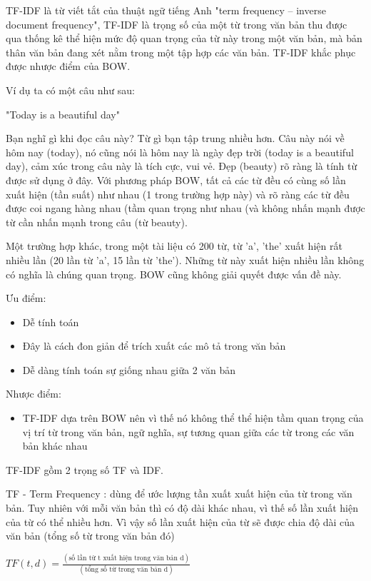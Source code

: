 TF-IDF là từ viết tắt của thuật ngữ tiếng Anh "term frequency – inverse document frequency", TF-IDF là trọng số của một từ trong văn bản thu được qua thống kê thể hiện mức độ quan trọng của từ này trong một văn bản, mà bản thân văn bản đang xét nằm trong một tập hợp các văn bản. TF-IDF khắc phục được nhược điểm của BOW.

Ví dụ ta có một câu như sau:

"Today is a beautiful day"

Bạn nghĩ gì khi đọc câu này? Từ gì bạn tập trung nhiều hơn. Câu này nói về hôm nay (today), nó cũng nói là hôm nay là ngày đẹp trời (today is a beautiful day), cảm xúc trong câu này là tích cực, vui vẻ. Đẹp (beauty) rõ ràng là tính từ được sử dụng ở đây. Với phương pháp BOW, tất cả các từ đều có cùng số lần xuất hiện (tần suất) như nhau (1 trong trường hợp này) và rõ ràng các từ đều được coi ngang hàng nhau (tầm quan trọng như nhau (và không nhấn mạnh được từ cần nhấn mạnh trong câu (từ beauty).

Một trường hợp khác, trong một tài liệu có 200 từ, từ 'a', 'the' xuất hiện rất nhiều lần (20 lần từ 'a', 15 lần từ 'the'). Những từ này xuất hiện nhiều lần không có nghĩa là chúng quan trọng. BOW cũng không giải quyết được vấn đề này.

Ưu điểm:
\begin{itemize}
    \item Dễ tính toán
    \item Đây là cách đon giản để trích xuất các mô tả trong văn bản
    \item Dễ dàng tính toán sự giống nhau giữa 2 văn bản
\end{itemize}

Nhược điểm:
\begin{itemize}
    \item TF-IDF dựa trên BOW nên vì thế nó không thể thể hiện tầm quan trọng của vị trí từ trong văn bản, ngữ nghĩa, sự tương quan giữa các từ trong các văn bản khác nhau
\end{itemize}

TF-IDF gồm 2 trọng số TF và IDF.

TF - Term Frequency : dùng để ước lượng tần xuất xuất hiện của từ trong văn bản. Tuy nhiên với mỗi văn bản thì có độ dài khác nhau, vì thế số lần xuất hiện của từ có thể nhiều hơn. Vì vậy số lần xuất hiện của từ sẽ được chia độ dài của văn bản (tổng số từ trong văn bản đó)

\begin{center}
    $TF(t, d) =  \frac{( \text{số lần từ t xuất hiện trong văn bản d})}{ (\text{tổng số từ trong văn bản d})}$
\end{center}

